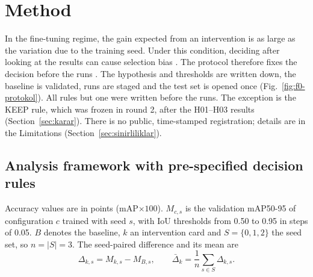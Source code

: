 \documentclass[pdflatex,iicol,sn-mathphys-num]{sn-jnl}
\begin{document}
\section{Method}\label{sec:yontem}

{%
}

In the fine-tuning regime, the gain expected from an intervention is as large as the variation due to the training seed. Under this condition, deciding after looking at the results can cause selection bias \cite{cawley_2010_overfitting,bouthillier_2021_variance}. The protocol therefore fixes the decision before the runs \cite{nosek_2018_preregistration}. The hypothesis and thresholds are written down, the baseline is validated, runs are staged and the test set is opened once (Fig.~\ref{fig:f0-protokol}). All rules but one were written before the runs. The exception is the KEEP rule, which was frozen in round 2, after the H01--H03 results (Section~\ref{sec:karar}). There is no public, time-stamped registration; details are in the Limitations (Section~\ref{sec:sinirliliklar}).

\subsection{Analysis framework with pre-specified decision rules}\label{sec:cerceve}

Accuracy values are in points (mAP$\times100$). $M_{c,s}$ is the validation mAP50-95 of configuration $c$ trained with seed $s$, with IoU thresholds from 0.50 to 0.95 in steps of 0.05. $B$ denotes the baseline, $k$ an intervention card and $S=\{0,1,2\}$ the seed set, so $n=|S|=3$. The seed-paired difference and its mean are
\begin{equation}\label{eq:delta}
\Delta_{k,s}=M_{k,s}-M_{B,s},\qquad \bar\Delta_k=\frac1n\sum_{s\in S}\Delta_{k,s}.
\end{equation}
\end{document}
